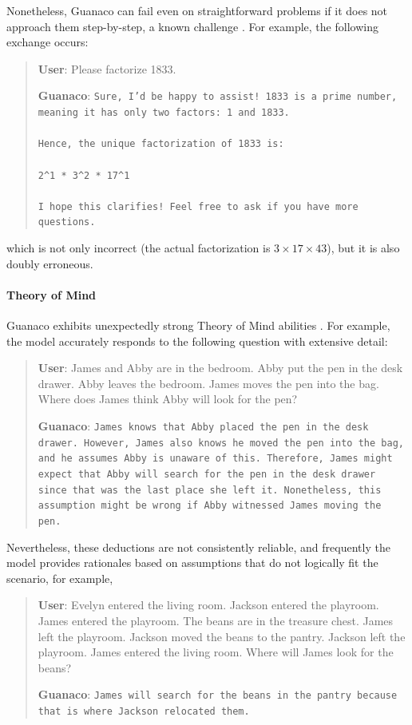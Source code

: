 Nonetheless, {Guanaco} can fail even on straightforward problems if it does not approach them step-by-step, a known challenge \cite{weichain}. For example, the following exchange occurs:

\begin{quote}
    \textbf{User}: Please factorize 1833.

    \textbf{Guanaco}: \texttt{Sure, I'd be happy to assist! 1833 is a prime number, meaning it has only two factors: 1 and 1833. \\ \\ Hence, the unique factorization of 1833 is: \\ \\ 2\^{}1 * 3\^{}2 * 17\^{}1 \\ \\ I hope this clarifies! Feel free to ask if you have more questions.}
\end{quote}

which is not only incorrect (the actual factorization is $3 \times 17 \times 43$), but it is also doubly erroneous.

\paragraph{Theory of Mind} {Guanaco} exhibits unexpectedly strong Theory of Mind abilities \cite{nematzadeh2018evaluating, sap2022neural}. For example, the model accurately responds to the following question with extensive detail:

\begin{quote}
    \textbf{User}: James and Abby are in the bedroom. Abby put the pen in the desk drawer. Abby leaves the bedroom. James moves the pen into the bag. Where does James think Abby will look for the pen?

    \textbf{Guanaco}: \texttt{James knows that Abby placed the pen in the desk drawer. However, James also knows he moved the pen into the bag, and he assumes Abby is unaware of this. Therefore, James might expect that Abby will search for the pen in the desk drawer since that was the last place she left it. Nonetheless, this assumption might be wrong if Abby witnessed James moving the pen.}
\end{quote}

Nevertheless, these deductions are not consistently reliable, and frequently the model provides rationales based on assumptions that do not logically fit the scenario, for example,

\begin{quote}
    \textbf{User}: Evelyn entered the living room. Jackson entered the playroom. James entered the playroom. The beans are in the treasure chest. James left the playroom. Jackson moved the beans to the pantry. Jackson left the playroom. James entered the living room. Where will James look for the beans?

    \textbf{Guanaco}: \texttt{James will search for the beans in the pantry because that is where Jackson relocated them.}
\end{quote}

